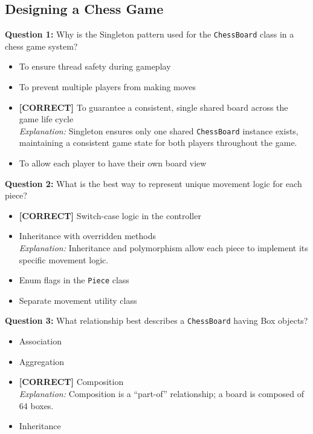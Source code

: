 \subsection*{Designing a Chess Game}
\vspace{0.3cm}
\noindent
\textbf{Question 1:} Why is the Singleton pattern used for the \texttt{ChessBoard} class in a chess game system?
\\[0.2cm]
\begin{itemize}
 \item To ensure thread safety during gameplay
 \item To prevent multiple players from making moves
 \item \textbf{[CORRECT]} To guarantee a consistent, single shared board across the game life cycle
\\[0.1cm]
\textit{Explanation:} 
Singleton ensures only one shared \texttt{ChessBoard} instance exists, maintaining a consistent game state for both players throughout the game.
 \item To allow each player to have their own board view
\end{itemize}
\vspace{0.3cm}
\noindent
\textbf{Question 2:} What is the best way to represent unique movement logic for each piece?
\\[0.2cm]
\begin{itemize}
 \item \textbf{[CORRECT]} Switch-case logic in the controller
 \item Inheritance with overridden methods
\\[0.1cm]
\textit{Explanation:} 
Inheritance and polymorphism allow each piece to implement its specific movement logic.
 \item Enum flags in the \texttt{Piece} class
 \item Separate movement utility class
\end{itemize}
\vspace{0.3cm}
\noindent
\textbf{Question 3:} What relationship best describes a \texttt{ChessBoard} having Box objects?
\\[0.2cm]
\begin{itemize}
 \item Association
 \item Aggregation
 \item \textbf{[CORRECT]} Composition
\\[0.1cm]
\textit{Explanation:} 
Composition is a ``part-of'' relationship; a board is composed of 64 boxes.
 \item Inheritance
\end{itemize}
